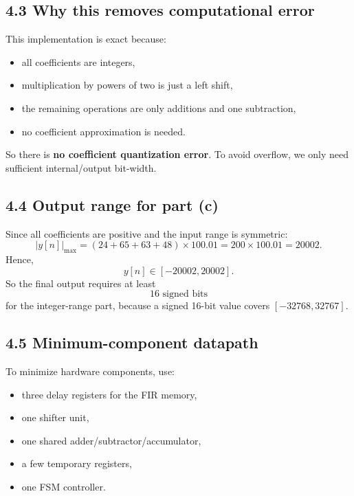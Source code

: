 \documentclass[11pt,a4paper]{article}
\begin{document}
\subsection*{4.3 Why this removes computational error}
This implementation is exact because:
\begin{itemize}
  \item all coefficients are integers,
  \item multiplication by powers of two is just a left shift,
  \item the remaining operations are only additions and one subtraction,
  \item no coefficient approximation is needed.
\end{itemize}
So there is \textbf{no coefficient quantization error}. To avoid overflow, we only need sufficient internal/output bit-width.

\subsection*{4.4 Output range for part (c)}
Since all coefficients are positive and the input range is symmetric:
\[
|y[n]|_{\max}=(24+65+63+48)\times 100.01 = 200\times 100.01 = 20002.
\]
Hence,
\[
y[n]\in[-20002,20002].
\]
So the final output requires at least
\[
\boxed{16\text{ signed bits}}
\]
for the integer-range part, because a signed 16-bit value covers $[-32768,32767]$.

\subsection*{4.5 Minimum-component datapath}
To minimize hardware components, use:
\begin{itemize}
  \item three delay registers for the FIR memory,
  \item one shifter unit,
  \item one shared adder/subtractor/accumulator,
  \item a few temporary registers,
  \item one FSM controller.
\end{itemize}
\end{document}
